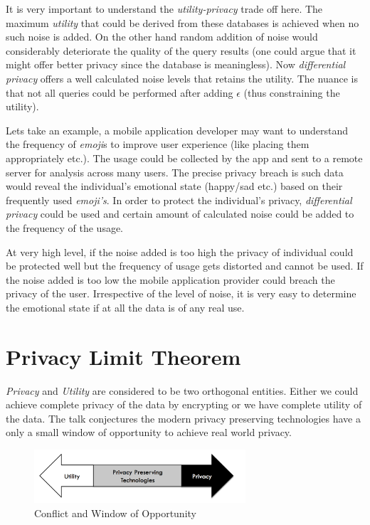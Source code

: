 \documentclass[11pt, oneside]{article}   	%
\numberwithin{equation}{section}
\begin{document}
It is very important to understand the \emph{utility-privacy} trade off here. The maximum \emph{utility} that could be derived from these databases is achieved when no such noise is added. On the other hand random addition of noise would considerably deteriorate the quality of the query results (one could argue that it might offer better privacy since the database is meaningless). Now \emph{differential privacy} offers a well calculated noise levels that retains the utility. The nuance is that not all queries could be performed after adding $\epsilon$ (thus constraining the utility). 

Lets take an example, a mobile application developer may want to understand the frequency  of \emph{emoji}s to improve user experience (like placing them appropriately etc.). The usage could be collected by the app and sent to a remote server for analysis across many users. The precise privacy breach is such data would reveal the individual's emotional state (happy/sad etc.) based on their frequently used \emph{emoji's}.  In order to protect the individual's privacy, \emph{differential privacy} could be used and certain amount of calculated noise could be added to the frequency of the usage. 

At very high level, if the noise added is too high the privacy of individual could be protected well but the frequency of usage gets distorted and cannot be used. If the noise added is too low the mobile application provider could breach the privacy of the user. Irrespective of the level of noise, it is very easy to determine the emotional state if at all the data is of any real use.  

\section{Privacy Limit Theorem}

\emph{Privacy} and \emph{Utility} are considered to be two orthogonal entities. Either we could achieve complete privacy of the data by encrypting  or we have complete utility of the data. The talk conjectures the modern privacy preserving technologies have a only a small  window of opportunity to achieve real world privacy.

\begin{figure}
  \begin{center}
    \includegraphics[width=0.7\textwidth]{conflict.png}
  \caption{Conflict and Window of Opportunity }
    \end{center}
\end{figure}
\end{document}

